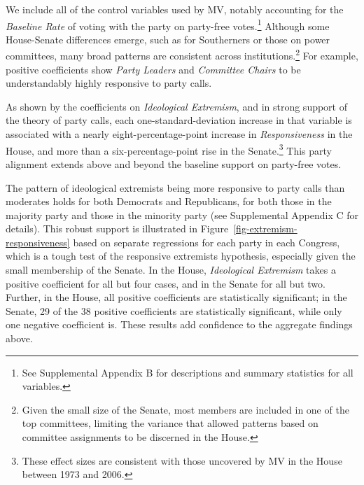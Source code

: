 \documentclass[12pt]{article}
\begin{document}
We include all of the control variables used by MV, notably accounting for the \textit{Baseline Rate} of voting with the party on party-free votes.\footnote{\doublespacing\normalsize See Supplemental Appendix B for descriptions and summary statistics for all variables.}  Although some House-Senate differences emerge, such as for Southerners or those on power committees, many broad patterns are consistent across institutions.\footnote{\doublespacing\normalsize Given the small size of the Senate, most members are included in one of the top committees, limiting the variance that allowed patterns based on committee assignments to be discerned in the House.}  For example, positive coefficients show \textit{Party Leaders} and \textit{Committee Chairs} to be understandably highly responsive to party calls.

As shown by the coefficients on \textit{Ideological Extremism}, and in strong support of the theory of party calls, each one-standard-deviation increase in that variable is associated with a nearly eight-percentage-point increase in \textit{Responsiveness} in the House, and more than a six-percentage-point rise in the Senate.\footnote{\doublespacing\normalsize These effect sizes are consistent with those uncovered by MV in the House between 1973 and 2006.}  This party alignment extends above and beyond the baseline support on party-free votes.

The pattern of ideological extremists being more responsive to party calls than moderates holds for both Democrats and Republicans, for both those in the majority party and those in the minority party (see Supplemental Appendix C for details). This robust support is illustrated in Figure~\ref{fig-extremism-responsiveness} based on separate regressions for each party in each Congress, which is a tough test of the responsive extremists hypothesis, especially given the small membership of the Senate. In the House, \textit{Ideological Extremism} takes a positive coefficient for all but four cases, and in the Senate for all but two. Further, in the House, all positive coefficients are statistically significant; in the Senate, 29 of the 38 positive coefficients are statistically significant, while only one negative coefficient is. These results add confidence to the aggregate findings above.
\end{document}
